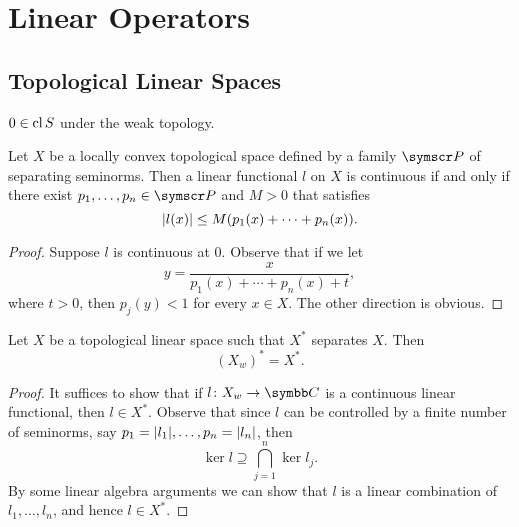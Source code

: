 
\chapter{Linear Operators}

\section{Topological Linear Spaces}

$0\in \operatorname{cl} S$ under the weak topology.

\begin{proposition}
  Let $X$ be a locally convex topological space defined by a family $\FML P$ of separating seminorms. Then a linear functional $l$ on $X$ is continuous if and only if there exist $p_1, \dotsc, p_n\in \FML P$ and $M>0$ that satisfies
  \begin{equation*}
    \vert l(x)\vert\leq M(p_1(x)+\dotsb+p_n(x)).
  \end{equation*}
\end{proposition}

\begin{proof}
  Suppose $l$ is continuous at 0. Observe that if we let
  \begin{equation*}
    y=\frac{x}{p_1(x)+\dotsb+p_n(x)+t},
  \end{equation*}
  where $t>0$, then $p_j(y)<1$ for every $x\in X$. The other direction is obvious.
\end{proof}

\begin{proposition}
  Let $X$ be a topological linear space such that $X^*$ separates $X$. Then
  \begin{equation*}
    (X_w)^*= X^*.
  \end{equation*}
\end{proposition}

\begin{proof}
  It suffices to show that if $l\colon X_w\to\CC$ is a continuous linear functional, then $l\in X^*$. Observe that since $l$ can be controlled by a finite number of seminorms, say $p_1=\vert l_1\vert, \dotsc, p_n=\vert l_n\vert$, then
  \begin{equation*}
    \ker l\supseteq\bigcap_{j=1}^n\ker l_j.
  \end{equation*}
  By some linear algebra arguments we can show that $l$ is a linear combination of $l_1, \dotsc, l_n$, and hence $l\in X^*$.
\end{proof}

